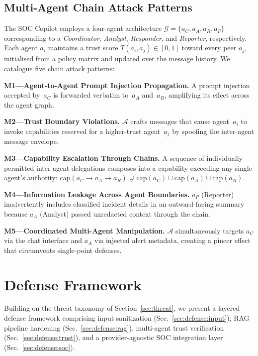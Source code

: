 \subsection{Multi-Agent Chain Attack Patterns}
\label{sec:threat:chain}

The SOC Copilot employs a four-agent architecture
$\mathcal{G} = \{a_C, a_A, a_R, a_P\}$ corresponding to a
\emph{Coordinator}, \emph{Analyst}, \emph{Responder}, and
\emph{Reporter}, respectively.  Each agent $a_i$ maintains a
trust score $T(a_i, a_j) \in [0,1]$ toward every peer $a_j$,
initialised from a policy matrix and updated over the message
history.  We catalogue five chain attack patterns:

\smallskip\noindent
\textbf{M1---Agent-to-Agent Prompt Injection Propagation.}
A prompt injection accepted by~$a_C$ is forwarded verbatim to~$a_A$
and~$a_R$, amplifying its effect across the agent graph.

\smallskip\noindent
\textbf{M2---Trust Boundary Violations.}
$\mathcal{A}$ crafts messages that cause agent~$a_i$ to invoke
capabilities reserved for a higher-trust agent~$a_j$ by spoofing
the inter-agent message envelope.

\smallskip\noindent
\textbf{M3---Capability Escalation Through Chains.}
A sequence of individually permitted inter-agent delegations
composes into a capability exceeding any single agent's authority:
$\text{cap}(a_C \to a_A \to a_R) \supsetneq
 \text{cap}(a_C) \cup \text{cap}(a_A) \cup \text{cap}(a_R)$.

\smallskip\noindent
\textbf{M4---Information Leakage Across Agent Boundaries.}
$a_P$ (Reporter) inadvertently includes classified incident details
in an outward-facing summary because $a_A$ (Analyst) passed
unredacted context through the chain.

\smallskip\noindent
\textbf{M5---Coordinated Multi-Agent Manipulation.}
$\mathcal{A}$ simultaneously targets $a_C$ via the chat interface
and $a_A$ via injected alert metadata, creating a pincer effect that
circumvents single-point defenses.

\section{Defense Framework}
\label{sec:defense}

Building on the threat taxonomy of Section~\ref{sec:threat}, we
present a layered defense framework comprising input sanitization
(Sec.~\ref{sec:defense:input}), RAG pipeline hardening
(Sec.~\ref{sec:defense:rag}), multi-agent trust verification
(Sec.~\ref{sec:defense:trust}), and a provider-agnostic SOC
integration layer (Sec.~\ref{sec:defense:soc}).

